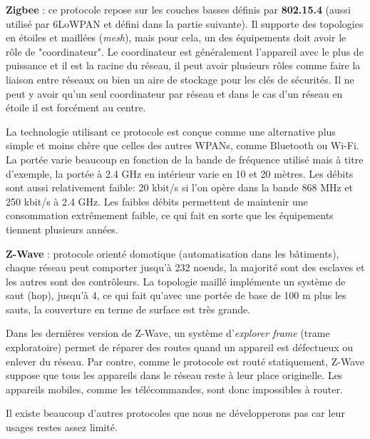 \textbf{Zigbee} : ce protocole repose sur les couches basses définis par \textbf{802.15.4} (aussi utilisé par 6LoWPAN et défini dans la partie suivante). Il supporte des topologies en étoiles et maillées (\textit{mesh}), mais pour cela, un des équipements doit avoir le rôle de "coordinateur". Le coordinateur est généralement l'appareil avec le plus de puissance et il est la racine du réseau, il peut avoir plusieurs rôles comme faire la liaison entre réseaux ou bien un aire de stockage pour les clés de sécurités. Il ne peut y avoir qu'un seul coordinateur par réseau et dans le cas d'un réseau en étoile il est forcément au centre.

La technologie utilisant ce protocole est conçue comme une alternative plus simple et moins chère que celles des autres WPANs, comme Bluetooth ou Wi-Fi. La portée varie beaucoup en fonction de la bande de fréquence utilisé mais à titre d'exemple, la portée à 2.4 GHz en intérieur varie en 10 et 20 mètres. Les débits sont aussi relativement faible: 20 kbit/s si l'on opère dans la bande 868 MHz et 250 kbit/s à 2.4 GHz. Les faibles débits permettent de maintenir une consommation extrêmement faible, ce qui fait en sorte que les équipements tiennent plusieurs années.	

\textbf{Z-Wave} : protocole orienté domotique (automatisation dans les bâtiments), chaque réseau peut comporter jusqu'à 232 noeuds, la majorité sont des esclaves et les autres sont des contrôleurs. La topologie maillé implémente un système de saut (hop), jusqu'à 4, ce qui fait qu'avec une portée de base de 100 m plus les sauts, la couverture en terme de surface est très grande.

Dans les dernières version de Z-Wave, un système d'\textit{explorer frame} (trame exploratoire) permet de réparer des routes quand un appareil est défectueux ou enlever du réseau. Par contre, comme le protocole est routé statiquement, Z-Wave suppose que tous les appareils dans le réseau reste à leur place originelle. Les appareils mobiles, comme les télécommandes, sont donc impossibles à router.

Il existe beaucoup d'autres protocoles que nous ne développerons pas car leur usages restes assez limité.
